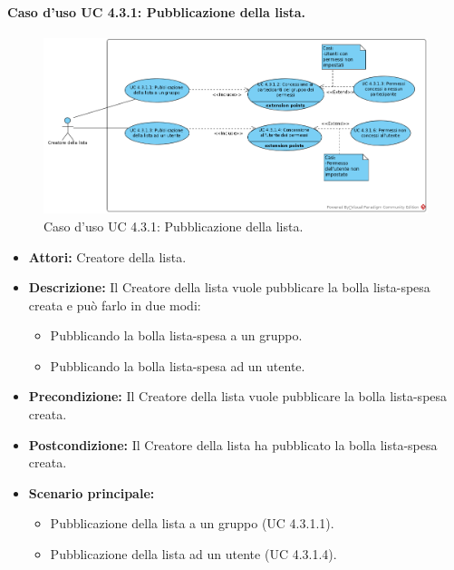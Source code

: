 \paragraph{Caso d'uso UC 4.3.1: Pubblicazione della lista.}
\label{Caso d'uso UC 4.3.1: Pubblicazione della lista.}

\begin{figure}[ht]
	\centering
	\includegraphics[scale=0.60]{Usecases/img/UC4.3.1.png}
	\caption{Caso d'uso UC 4.3.1: Pubblicazione della lista.}
\end{figure}

\FloatBarrier
\begin{itemize}
\item \textbf{Attori:} Creatore della lista.
\item \textbf{Descrizione:} Il Creatore della lista vuole pubblicare la bolla lista-spesa creata e può farlo in due modi:
\begin{itemize}
\item Pubblicando la bolla lista-spesa a un gruppo.
\item Pubblicando la bolla lista-spesa ad un utente.
\end{itemize}
\item \textbf{Precondizione:} Il Creatore della lista vuole pubblicare la bolla lista-spesa creata. 
\item \textbf{Postcondizione:} Il Creatore della lista ha pubblicato la bolla lista-spesa creata.
\item \textbf{Scenario principale:}
	\begin{itemize}
	\item{Pubblicazione della lista a un gruppo (UC 4.3.1.1).}
	\item{Pubblicazione della lista ad un utente (UC 4.3.1.4).}
	\end{itemize}
\end{itemize}